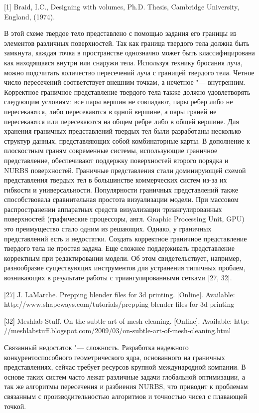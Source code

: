 {{{{{{[1] Braid, I.C., Designing with volumes, Ph.D. Thesis, Cambridge University, England, (1974).

В этой схеме твердое тело представлено с помощью задания его границы из элементов различных поверхностей. Так как граница твердого тела должна быть замкнута, каждая точка в пространстве однозначно может быть классифицирована как находящаяся внутри или снаружи тела. Используя технику бросания луча, можно подсчитать количество пересечений  луча с границей твердого тела. Четное число пересечений соответствует внешним точкам, а нечетное "--- внутренним. Корректное граничное представление твердого тела также должно удовлетворять следующим условиям: все пары вершин не совпадают, пары ребер либо не пересекаются, либо пересекаются в одной вершине, а пары граней не пересекаются или пересекаются на общем ребре либо в общей вершине. Для хранения граничных представлений твердых тел были разработаны несколько структур данных, представляющих собой комбинаторные карты. В дополнение к плоскостным граням современные системы, использующие граничное представление, обеспечивают поддержку поверхностей второго порядка и NURBS поверхностей. Граничные представления стали доминирующей схемой представления твердых тел в большинстве коммерческих систем из-за их гибкости и универсальности. Популярности граничных представлений также способствовала сравнительная простота визуализации модели. При массовом распространении аппаратных средств визуализации триангулированных поверхностей (графические процессоры, англ. Graphic Processing Unit, GPU) это преимущество стало одним из решающих. Однако, у граничных представлений есть и недостатки. Создать корректное граничное представление твердого тела не простая задача. Еще сложнее поддерживать представление корректным при редактировании модели. Об этом свидетельствует, например, разнообразие существующих инструментов для устранения типичных проблем, возникающих в результате работы с триангулированными сетками [27, 32].

[27] J. LaMarche. Prepping blender files for 3d printing. [Online]. Available:
http://www.shapeways.com/tutorials/prepping blender files for 3d printing

[32] Meshlab Stuff. On the subtle art of mesh cleaning. [Online]. Available: http:
//meshlabstuff.blogspot.com/2009/03/on-subtle-art-of-mesh-cleaning.html

Связанный недостаток "--- сложность. Разработка надежного конкурентоспособного геометрического ядра, основанного на граничных представлениях, сейчас требует ресурсов крупной международной компании. В основе таких систем часто лежат различные задачи глобальной оптимизации, а так же алгоритмы пересечения и разбиения NURBS, что приводит к проблемам связанным с производительностью алгоритмов и точностью чисел с плавающей точкой.

}}}}}}
